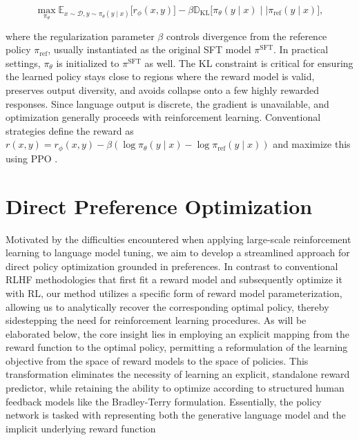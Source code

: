 \begin{equation}\label{eq:RL}
\max_{\pi_{\theta}}  \mathbb{E}_{x\sim \mathcal{D}, y\sim \pi_{\theta}(y \mid x)}\bigl[r_{\phi}(x, y)\bigr] - \beta\mathbb{D}_{\textrm{KL}}\bigl[\pi_{\theta}(y\mid x)\mid \mid \pi_\text{ref}(y\mid x)\bigr],
\end{equation}

where the regularization parameter $\beta$ controls divergence from the reference policy $\pi_\text{ref}$, usually instantiated as the original SFT model $\pi^\text{SFT}$. In practical settings, $\pi_\theta$ is initialized to $\pi^\text{SFT}$ as well. The KL constraint is critical for ensuring the learned policy stays close to regions where the reward model is valid, preserves output diversity, and avoids collapse onto a few highly rewarded responses. Since language output is discrete, the gradient is unavailable, and optimization generally proceeds with reinforcement learning. Conventional strategies \citep{ziegler2020finetuning, stiennon2022learning, bai2022training, ouyang2022training} define the reward as ${r(x, y) = r_{\phi}(x, y) -\beta (\log \pi_{\theta}(y\mid x) - \log \pi_\text{ref}(y\mid x))}$ and maximize this using PPO \cite{schulman2017proximal}.

\section{Direct Preference Optimization}\label{sec:DPO}

Motivated by the difficulties encountered when applying large-scale reinforcement learning to language model tuning, we aim to develop a streamlined approach for direct policy optimization grounded in preferences. In contrast to conventional RLHF methodologies that first fit a reward model and subsequently optimize it with RL, our method utilizes a specific form of reward model parameterization, allowing us to analytically recover the corresponding optimal policy, thereby sidestepping the need for reinforcement learning procedures. As will be elaborated below, the core insight lies in employing an explicit mapping from the reward function to the optimal policy, permitting a reformulation of the learning objective from the space of reward models to the space of policies. This transformation eliminates the necessity of learning an explicit, standalone reward predictor, while retaining the ability to optimize according to structured human feedback models like the Bradley-Terry formulation. Essentially, the policy network is tasked with representing both the generative language model and the implicit underlying reward function

